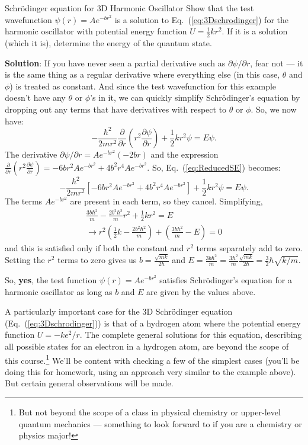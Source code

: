 \begin{example}{Schr\"{o}dinger equation for 3D Harmonic Oscillator}
Show that the test wavefunction $\psi(r) = Ae^{-br^2}$ is a solution
to Eq.~(\ref{eq:3Dschrodinger}) for the harmonic oscillator with
potential energy function $U =\frac{1}{2}kr^2$. If it is a solution
(which it is), determine the energy of the quantum state.

{\bf Solution}: If you have never seen a partial derivative such as
$\partial \psi/\partial r$, fear not --- it is the same thing as a
regular derivative where everything else (in this case, $\theta$ and
$\phi$) is treated as constant.  And since the test wavefunction for
this example doesn't have any $\theta$ or $\phi$'s in it, we can
quickly simplify Schr\"{o}dinger's equation by dropping out any terms
that have derivatives with respect to $\theta$ or $\phi$. So, we now
have:
\begin{equation}
-\frac{\hbar^2}{2mr^2} \frac{\partial}{\partial r} \left( r^2
\frac{\partial \psi}{\partial r} \right) + \frac{1}{2}kr^2 \psi = E
\psi.
\label{eq:ReducedSE}
\end{equation}
The derivative $\partial \psi/\partial r = Ae^{-br^2}(-2br)$ and the
expression $\frac{\partial}{\partial r}(r^2\frac{\partial
  \psi}{\partial r}) = -6br^2Ae^{-br^2} +4b^2r^4Ae^{-br^2}$. So,
Eq.~(\ref{eq:ReducedSE}) becomes:
\begin{equation}
-\frac{\hbar^2}{2mr^2} \left[-6br^2Ae^{-br^2}+4b^2r^4Ae^{-br^2}\right]
+ \frac{1}{2}kr^2 \psi = E \psi.
\end{equation}
The terms $Ae^{-br^2}$ are present in each term, so they
cancel. Simplifying,
\begin{align}
\frac{3b\hbar^2}{m} - \frac{2b^2\hbar^2}{m}r^2 + \frac{1}{2}kr^2 =
E\\ \rightarrow r^2\left(\frac{1}{2}k-\frac{2b^2\hbar^2}{m}\right) +
\left(\frac{3b\hbar^2}{m} - E\right) = 0
\end{align}
and this is satisfied only if both the constant and $r^2$ terms
separately add to zero.  Setting the $r^2$ terms to zero gives us $b =
\frac{\sqrt{mk}}{2\hbar}$ and $E = \frac{3b\hbar^2}{m} =
\frac{3\hbar^2}{m}\frac{\sqrt{mk}}{2\hbar} =
\frac{3}{2}\hbar\sqrt{k/m}$.

So, {\bf yes}, the test function $\psi(r) = Ae^{-br^2}$ satisfies
Schr\"{o}dinger's equation for a harmonic oscillator as long as $b$
and $E$ are given by the values above.
\end{example}

A particularly important case for the 3D Schr\"{o}dinger equation
(Eq.~(\ref{eq:3Dschrodinger})) is that of a hydrogen atom where the
potential energy function $U = -ke^2/r$.  The complete general
solutions for this equation, describing all possible states for an
electron in a hydrogen atom, are beyond the scope of this
course.\footnote{But not beyond the scope of a class in physical
  chemistry or upper-level quantum mechanics --- something to look
  forward to if you are a chemistry or physics major!}  We'll be
content with checking a few of the simplest cases (you'll be doing
this for homework, using an approach very similar to the example
above).  But certain general observations will be made.

